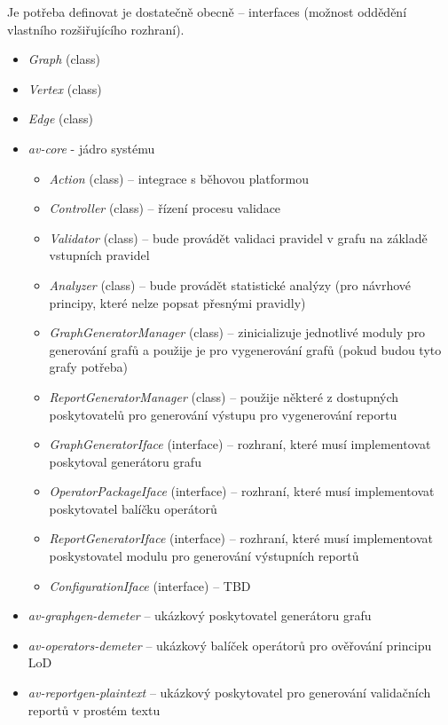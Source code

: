 Je potřeba definovat je dostatečně obecně -- interfaces (možnost oddědění vlastního rozšiřujícího rozhraní).

\begin{itemize}
\item \emph{Graph} (class)
\item \emph{Vertex} (class)
\item \emph{Edge} (class)
\end{itemize}

\begin{itemize}
\item \emph{av-core} - jádro systému
  \begin{itemize}
  \item \emph{Action} (class) -- integrace s běhovou platformou
  \item \emph{Controller} (class) -- řízení procesu validace
  \item \emph{Validator} (class) -- bude provádět validaci pravidel v grafu na základě vstupních pravidel
  \item \emph{Analyzer} (class) -- bude provádět statistické analýzy (pro návrhové principy, které nelze popsat přesnými pravidly)
  \item \emph{GraphGeneratorManager} (class) -- zinicializuje jednotlivé moduly pro generování grafů a použije je pro vygenerování grafů (pokud budou tyto grafy potřeba)
  \item \emph{ReportGeneratorManager} (class) -- použije některé z dostupných poskytovatelů pro generování výstupu pro vygenerování reportu
  \item \emph{GraphGeneratorIface} (interface) -- rozhraní, které musí implementovat poskytoval generátoru grafu
  \item \emph{OperatorPackageIface} (interface) -- rozhraní, které musí implementovat poskytovatel balíčku operátorů
  \item \emph{ReportGeneratorIface} (interface) -- rozhraní, které musí implementovat poskystovatel modulu pro generování výstupních reportů
  \item \emph{ConfigurationIface} (interface) --  TBD
  \end{itemize}
\item \emph{av-graphgen-demeter} -- ukázkový poskytovatel generátoru grafu
\item \emph{av-operators-demeter} -- ukázkový balíček operátorů pro ověřování principu LoD
\item \emph{av-reportgen-plaintext} -- ukázkový poskytovatel pro generování validačních reportů v prostém textu
\end{itemize}

